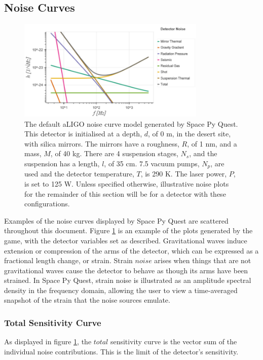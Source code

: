 \documentclass{article}
\begin{document}
\subsection{Noise Curves}
\begin{figure}
\centering
\includegraphics[width=0.8\textwidth]{SPQ_aLIGO.pdf}
\caption{The default aLIGO noise curve model generated by Space Py
  Quest. This detector is initialised at a depth, $d$, of 0 m, in the
  desert site, with silica mirrors. The mirrors have a roughness, $R$,
  of 1 nm, and a mass, $M$, of 40 kg. There are 4 suspension stages,
  $N_s$, and the suspension has a length, $l$, of 35 cm. 7.5 vacuum
  pumps, $N_p$, are used and the detector temperature, $T$, is 290
  K. The laser power, $P$, is set to 125 W. Unless specified
  otherwise, illustrative noise plots for the remainder of this
  section will be for a detector with these configurations.}
\label{fig:aLIGO}
\end{figure}
Examples of the noise curves displayed by Space Py Quest are scattered
throughout this document. Figure \ref{fig:aLIGO} is an example of the
plots generated by the game, with the detector variables set as
described. Gravitational waves induce extension or compression of the
arms of the detector, which can be expressed as a fractional length
change, or strain. Strain $noise$ arises when things that are not
gravitational waves cause the detector to behave as though its arms
have been strained. In Space Py Quest, strain noise is illustrated as
an amplitude spectral density in the frequency domain, allowing the
user to view a time-averaged snapshot of the strain that the noise
sources emulate.

\subsubsection{Total Sensitivity Curve}
As displayed in figure \ref{fig:aLIGO}, the $total$ sensitivity curve
is the vector sum of the individual noise contributions. This is the
limit of the detector's sensitivity.
\end{document}
